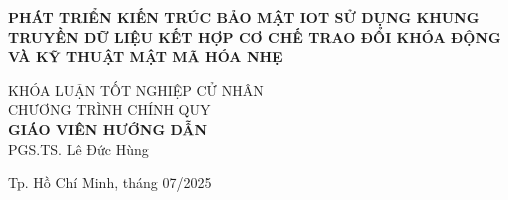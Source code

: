 \begin{titlepage}
\begin{center}
{ \Large \bfseries PHÁT TRIỂN KIẾN TRÚC BẢO MẬT IOT SỬ DỤNG KHUNG TRUYỀN DỮ LIỆU KẾT HỢP CƠ CHẾ TRAO ĐỔI KHÓA ĐỘNG VÀ KỸ THUẬT MẬT MÃ HÓA NHẸ\\[2cm] } 


\large KHÓA LUẬN TỐT NGHIỆP CỬ NHÂN\\
\large CHƯƠNG TRÌNH CHÍNH QUY\\[2cm]

\textbf{GIÁO VIÊN HƯỚNG DẪN}\\
PGS.TS. Lê Đức Hùng


\vfill
Tp. Hồ Chí Minh, tháng 07/2025

\end{center}

\end{titlepage}